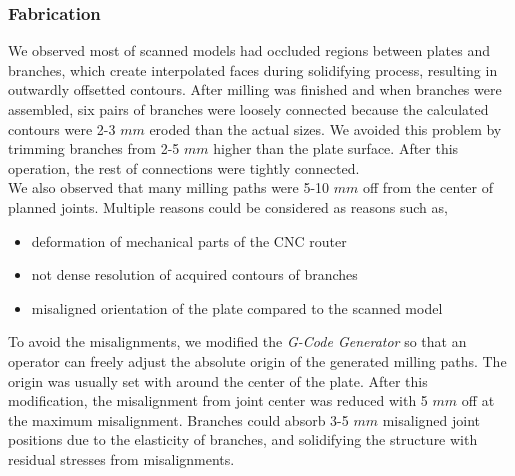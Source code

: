\subsubsection*{Fabrication}

We observed most of scanned models had occluded regions between plates and branches, which create interpolated faces during solidifying process, resulting in outwardly offsetted contours.  After milling was finished and when branches were assembled, six pairs of branches were loosely connected because the calculated contours were 2-3 $mm$ eroded than the actual sizes.
We avoided this problem by trimming branches from 2-5 $mm$ higher than the plate surface.
After this operation, the rest of connections were tightly connected. \\

We also observed that many milling paths were 5-10 $mm$ off from the center of planned joints.
Multiple reasons could be considered as reasons such as,

\begin{itemize}
  \item{deformation of mechanical parts of the CNC router}
  \item{not dense resolution of acquired contours of branches}
  \item{misaligned orientation of the plate compared to the scanned model}
\end{itemize}

To avoid the misalignments, we modified the \textit{G-Code Generator} so that an operator can freely adjust the absolute origin of the generated milling paths.
The origin was usually set with around the center of the plate.
After this modification, the misalignment from joint center was reduced with 5 $mm$ off at the maximum misalignment.
Branches could absorb 3-5 $mm$ misaligned joint positions due to the elasticity of branches, and solidifying the structure with residual stresses from misalignments.





